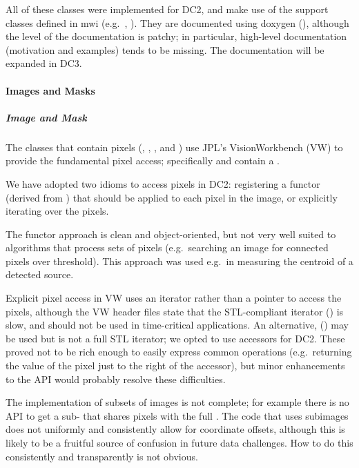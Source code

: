 All of these classes were implemented for DC2, and make use of
the support classes defined in mwi (e.g.~,
).  They are documented using doxygen (),
although the level of the documentation is patchy; in particular,
high-level documentation (motivation and examples) tends to be 
missing. The documentation will be expanded in DC3.

\paragraph{Images and Masks}

\subparagraph{Image and Mask}
The classes that contain pixels (, ,
, and ) use JPL's VisionWorkbench
(VW) to provide the fundamental pixel access; specifically
 and  contain a .

We have adopted two idioms to access pixels in DC2: registering
a functor (derived from ) that should be applied
to each pixel in the image, or explicitly iterating over the pixels.

The functor approach is clean and object-oriented, but not very well
suited to algorithms that process sets of pixels (e.g.~searching an
image for connected pixels over threshold).  This approach was used e.g.~in
measuring the centroid of a detected source.

Explicit pixel access in VW uses an iterator rather than a pointer to
access the pixels, although the VW header files state that the
STL-compliant iterator () is slow, and should
not be used in time-critical applications.  An alternative,
() may be used but is not a full
STL iterator; we opted to use accessors for DC2.  These proved not to
be rich enough to easily express common operations (e.g.~returning the
value of the pixel just to the right of the accessor), but minor
enhancements to the API would probably resolve these difficulties.

The implementation of subsets of images is not complete; for example
there is no  API to get a sub- that shares
pixels with the full .  The code that uses subimages
does not uniformly and consistently allow for coordinate offsets,
although this is likely to be a fruitful source of confusion in
future data challenges.  How to do this consistently and transparently
is not obvious.

